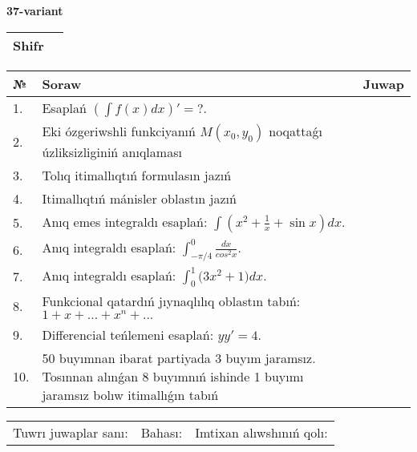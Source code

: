 \documentclass{article}
\begin{document}
  \egroup
  
  \newpage
  
  
  \textbf{37-variant}\\
  
  \bgroup
  \def\arraystretch{1.6} %
  
  \begin{tabular}{|m{5.7cm}|m{9.5cm}|}
  \hline
  Shifr & \\
  \hline
  \end{tabular}
  
  \vspace{1cm}
  
  \begin{tabular}{|m{0.7cm}|m{10cm}|m{4cm}|}
  \hline
  № & Soraw & Juwap \\
  \hline
  1. & Esaplań \(\left( \int{f(x)dx} \right)' = ?\). &  \\
  \hline
  2. & Eki ózgeriwshli funkciyanıń \(M(x_{0}, y_{0})\) noqattaǵı úzliksizliginiń anıqlaması &  \\
  \hline
  3. & Tolıq itimallıqtıń formulasın jazıń &  \\
  \hline
  4. & Itimallıqtıń mánisler oblastın jazıń &  \\
  \hline
  5. & Anıq emes integraldı esaplań: \(\int{\left( x^2  + \frac{1}{x} + \sin x \right)dx}\). &  \\
  \hline
  6. & Anıq integraldı esaplań: \(\int_{- \pi/4}^{0}\frac{dx}{cos^2 x}\). &  \\
  \hline
  7. & Anıq integraldı esaplań: \(\int_{0}^{1}{(3x^2 } + 1)dx\). &  \\
  \hline
  8. & Funkcional qatardıń jıynaqlılıq oblastın tabıń:\(1 + x + ... + x^{n} + ...\) &  \\
  \hline
  9. & Differencial teńlemeni esaplań: \(yy' = 4\). &  \\
  \hline
  10. & 50 buyımnan ibarat partiyada 3 buyım jaramsız. Tosınnan alınǵan 8 buyımnıń ishinde 1 buyımı jaramsız bolıw itimallıǵın tabıń &  \\
  \hline
  \end{tabular}
  
  \vspace{1cm}
  
  \begin{tabular}{lll}
  Tuwrı juwaplar sanı: \underline{\hspace{1.5cm}} & 
  Bahası: \underline{\hspace{1.5cm}} & 
  Imtixan alıwshınıń qolı: \underline{\hspace{2cm}} \\
  \end{tabular}
  
\end{document}
